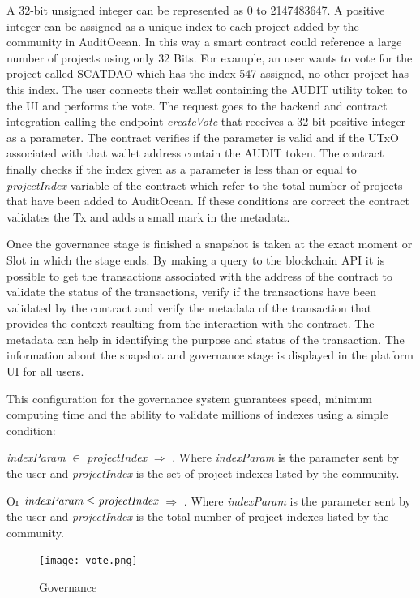 \documentclass[9pt]{article}
\begin{document}
A 32-bit unsigned integer can be represented as 0 to 2147483647. A positive integer can be assigned as a unique index to each project added by the community in AuditOcean. In this way a smart contract could reference a large number of projects using only 32 Bits. For example, an user wants to vote for the project called SCATDAO which has the index 547 assigned, no other project has this index. The user connects their wallet containing the AUDIT utility token to the UI and performs the vote. The request goes to the backend and contract integration calling the endpoint \emph{createVote} that receives a 32-bit positive integer as a parameter. The contract verifies if the parameter is valid and if the UTxO associated with that wallet address contain the AUDIT token. The contract finally checks if the index given as a parameter is less than or equal to \emph{projectIndex} variable of the contract which refer to the total number of projects that have been added to AuditOcean. If these conditions are correct the contract validates the Tx and adds a small mark in the metadata.


Once the governance stage is finished a snapshot is taken at the exact moment or Slot in which the stage ends. By making a query to the blockchain API it is possible to get the transactions associated with the address of the contract to validate the status of the transactions, verify if the transactions have been validated by the contract and verify the metadata of the transaction that provides the context resulting from the interaction with the contract. The metadata can help in identifying the purpose and status of the transaction. The information about the snapshot and governance stage is displayed in the platform UI for all users.

This configuration for the governance system guarantees speed, minimum computing time and the ability to validate millions of indexes using a simple condition:

\emph{indexParam} $\in$ \emph{projectIndex} $\Rightarrow$ .  Where \emph{indexParam} is the parameter sent by the user and \emph{projectIndex} is the set of project indexes listed by the community. 

Or $\emph{indexParam} \leq \emph{projectIndex}$  $\Rightarrow$ . Where \emph{indexParam} is the parameter sent by the user and \emph{projectIndex} is the total number of project indexes listed by the community.

\begin{figure}[ht]
  \centering
  \texttt{[image: vote.png]}
  \caption{Governance
  }
  \label{fig:mi_imagen}
\end{figure}
\end{document}
